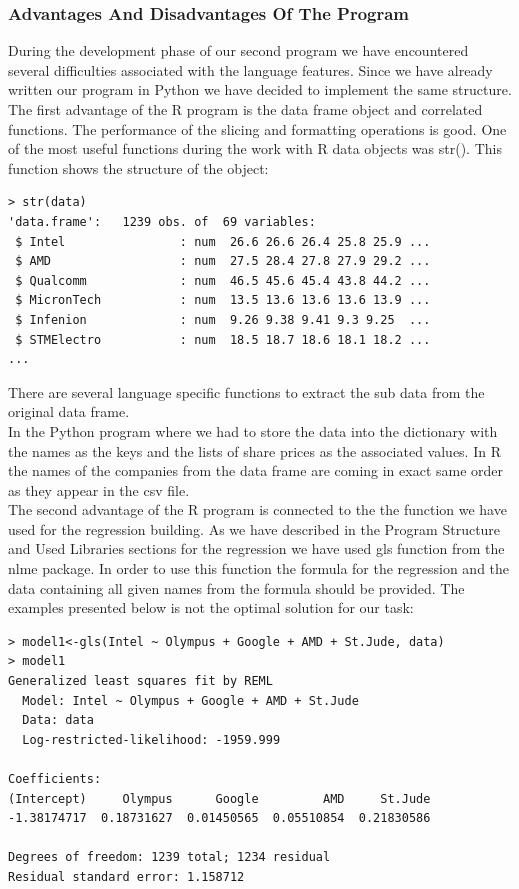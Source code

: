\documentclass [twoside,
  11pt, a4paper,
  footinclude=true,
  headinclude=true,
  cleardoublepage=empty
]{article}
\begin{document}
\subsubsection{Advantages And Disadvantages Of The Program}
During the development phase of our second program we have encountered several difficulties associated with the language features. Since we have already written our program in Python we have decided to implement the same structure.\\
The first advantage of the R program is the data frame object and correlated functions. The performance of the slicing and formatting operations is good. One of the most useful functions during the work with R data objects was str(). This function shows the structure of the object:
\begin{verbatim}
> str(data)
'data.frame':   1239 obs. of  69 variables:
 $ Intel                : num  26.6 26.6 26.4 25.8 25.9 ...
 $ AMD                  : num  27.5 28.4 27.8 27.9 29.2 ...
 $ Qualcomm             : num  46.5 45.6 45.4 43.8 44.2 ...
 $ MicronTech           : num  13.5 13.6 13.6 13.6 13.9 ...
 $ Infenion             : num  9.26 9.38 9.41 9.3 9.25  ...
 $ STMElectro           : num  18.5 18.7 18.6 18.1 18.2 ...
...
\end{verbatim}
There are several language specific functions to extract the sub data from the original data frame.\\
In the Python program where we had to store the data into the dictionary with the names as the keys and the lists of share prices as the associated values. In R the names of the companies from the data frame are coming in exact same order as they appear in the csv file.\\
The second advantage of the R program is connected to the the function we have used for the regression building. As we have described in the Program Structure and Used Libraries sections for the regression we have used gls function from the nlme package. In order to use this function the formula for the regression and the data containing all given names from the formula should be provided. The examples presented below is not the optimal solution for our task:
\begin{verbatim}
> model1<-gls(Intel ~ Olympus + Google + AMD + St.Jude, data)
> model1
Generalized least squares fit by REML
  Model: Intel ~ Olympus + Google + AMD + St.Jude 
  Data: data 
  Log-restricted-likelihood: -1959.999

Coefficients:
(Intercept)     Olympus      Google         AMD     St.Jude 
-1.38174717  0.18731627  0.01450565  0.05510854  0.21830586 

Degrees of freedom: 1239 total; 1234 residual
Residual standard error: 1.158712
\end{verbatim}
\end{document}
